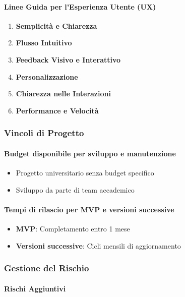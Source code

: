 \paragraph{Linee Guida per l'Esperienza Utente (UX)}

\begin{enumerate}
    \item \textbf{Semplicità e Chiarezza}
    \item \textbf{Flusso Intuitivo}
    \item \textbf{Feedback Visivo e Interattivo}
    \item \textbf{Personalizzazione}
    \item \textbf{Chiarezza nelle Interazioni}
    \item \textbf{Performance e Velocità}
\end{enumerate}

\subsubsection{Vincoli di Progetto}

\paragraph{Budget disponibile per sviluppo e manutenzione}

\begin{itemize}
    \item Progetto universitario senza budget specifico
    \item Sviluppo da parte di team accademico
\end{itemize}

\paragraph{Tempi di rilascio per MVP e versioni successive}

\begin{itemize}
    \item \textbf{MVP}: Completamento entro 1 mese
    \item \textbf{Versioni successive}: Cicli mensili di aggiornamento
\end{itemize}

\subsubsection{Gestione del Rischio}

\paragraph{Rischi Aggiuntivi}

